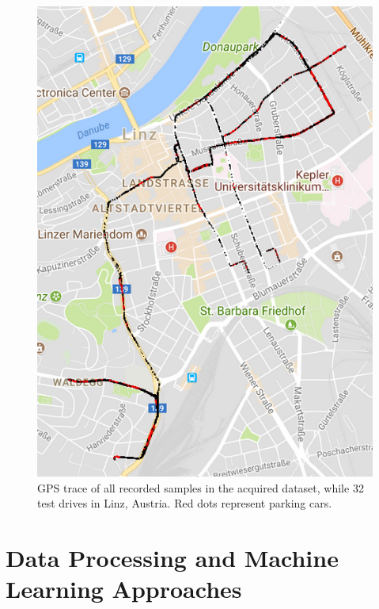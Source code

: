 \begin{figure}
	\centering
	\includegraphics{img/gps_data_recorded_data_parking_spaces.PNG}
	\caption{GPS trace of all recorded samples in the acquired dataset, while 32 test drives in Linz, Austria. Red dots represent parking cars.}
	\label{fig:gps_locations_dataset}
\end{figure}


















\chapter{Data Processing and Machine Learning Approaches}
\label{chap:data_processing_and_ml}

